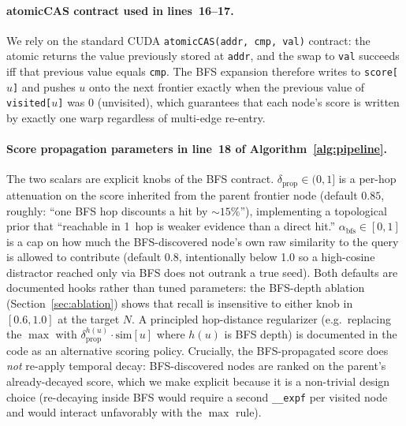 \documentclass[11pt]{article}
\begin{document}
\paragraph{atomicCAS contract used in lines~16--17.}
We rely on the standard CUDA \texttt{atomicCAS(addr, cmp, val)}
contract: the atomic returns the value previously stored at
\texttt{addr}, and the swap to \texttt{val} succeeds iff that previous
value equals \texttt{cmp}. The BFS expansion therefore writes to
\texttt{score[$u$]} and pushes $u$ onto the next frontier exactly when
the previous value of \texttt{visited[$u$]} was $0$ (unvisited),
which guarantees that each node's score is written by exactly one
warp regardless of multi-edge re-entry.

\paragraph{Score propagation parameters in line~18 of Algorithm~\ref{alg:pipeline}.} The two scalars
are explicit knobs of the BFS contract.
$\delta_{\text{prop}} \in (0, 1]$ is a per-hop attenuation on the
score inherited from the parent frontier node (default $0.85$,
roughly: ``one BFS hop discounts a hit by ${\sim}15\%$''),
implementing a topological prior that ``reachable in 1~hop is
weaker evidence than a direct hit.''
$\alpha_{\text{bfs}} \in [0, 1]$ is a cap on how much the
BFS-discovered node's own raw similarity to the query is allowed to
contribute (default $0.8$, intentionally below 1.0 so a high-cosine
distractor reached only via BFS does not outrank a true seed).
Both defaults are documented hooks rather than tuned parameters: the
BFS-depth ablation (Section~\ref{sec:ablation}) shows that recall is
insensitive to either knob in $[0.6, 1.0]$ at the target $N$. A
principled hop-distance regularizer (e.g.\ replacing the $\max$ with
$\delta_{\text{prop}}^{h(u)} \cdot \text{sim}[u]$ where $h(u)$ is BFS
depth) is documented in the code as an alternative scoring policy.
Crucially, the BFS-propagated score does \emph{not} re-apply temporal
decay: BFS-discovered nodes are ranked on the parent's
already-decayed score, which we make explicit because it is a
non-trivial design choice (re-decaying inside BFS would require a
second \texttt{\_\_expf} per visited node and would interact
unfavorably with the $\max$ rule).
\end{document}
